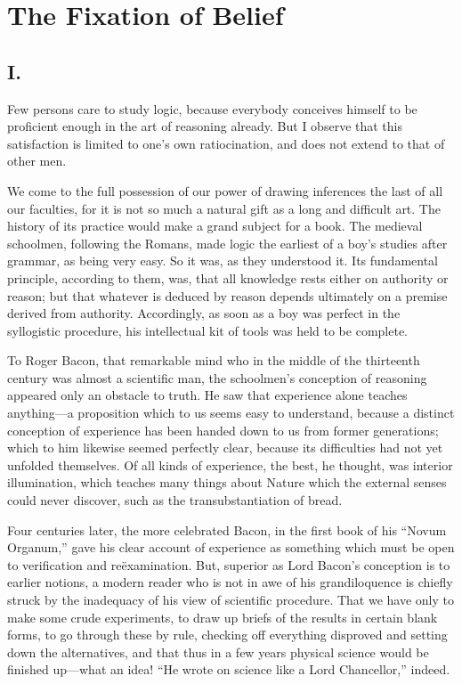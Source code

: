 
\author{Charles Sanders Peirce}
\chapter{The Fixation of Belief}

\section*{I.}

Few persons care to study logic, because everybody conceives himself
to be proficient enough in the art of reasoning already. But I observe
that this satisfaction is limited to one's own ratiocination, and does
not extend to that of other men.

We come to the full possession of our power of drawing inferences the
last of all our faculties, for it is not so much a natural gift as a
long and difficult art. The history of its practice would make a grand
subject for a book. The medieval schoolmen, following the Romans, made
logic the earliest of a boy's studies after grammar, as being very
easy. So it was, as they understood it. Its fundamental principle,
according to them, was, that all knowledge rests either on authority
or reason; but that whatever is deduced by reason depends ultimately
on a premise derived from authority. Accordingly, as soon as a boy
was perfect in the syllogistic procedure, his intellectual kit of
tools was held to be complete.

To Roger Bacon, that remarkable mind who in the middle of the
thirteenth century was almost a scientific man, the schoolmen's
conception of reasoning appeared only an obstacle to truth. He saw
that experience alone teaches anything---a proposition which to us
seems easy to understand, because a distinct conception of experience
has been handed down to us from former generations; which to him
likewise seemed perfectly clear, because its difficulties had not yet
unfolded themselves. Of all kinds of experience, the best, he thought,
was interior illumination, which teaches many things about Nature
 which the external senses could never discover, such as the
transubstantiation of bread.

Four centuries later, the more celebrated Bacon, in the first book of
his ``Novum Organum,'' gave his clear account of experience as
something which must be open to verification and re\"{e}xamination.
But, superior as Lord Bacon's conception is to earlier notions, a
modern reader who is not in awe of his grandiloquence is chiefly
struck by the inadequacy of his view of scientific procedure. That we
have only to make some crude experiments, to draw up briefs of the
results in certain blank forms, to go through these by rule, checking
off everything disproved and setting down the alternatives, and that
thus in a few years physical science would be finished up---what an
idea! ``He wrote on science like a Lord Chancellor,'' indeed.

